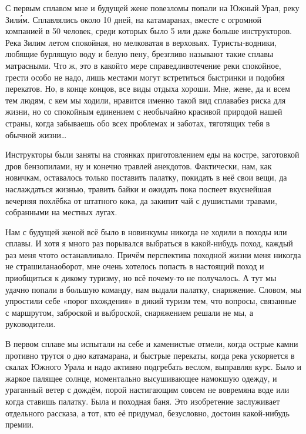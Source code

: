 С первым сплавом мне и будущей жене повезло\mdash мы попали на Южный Урал, реку Зил\'{и}м. Сплавлялись около 10 дней, на катамаранах, вместе с огромной компанией в 50 человек, среди которых было 5 или даже больше инструкторов. Река Зилим летом спокойная, но мелковатая в верховьях. Туристы-водники, любящие бурлящую воду и белую пену, брезгливо называют такие сплавы матрасными. Что ж, это в какой\sdash то мере справедливо\mdash течение реки спокойное, грести особо не надо, лишь местами могут встретиться быстринки и подобия перекатов. Но, в конце концов, все виды отдыха хороши. Мне, жене, да и всем тем людям, с кем мы ходили, нравится именно такой вид сплава\mdash без риска для жизни, но со спокойным единением с необычайно красивой природой нашей страны, когда забываешь обо всех проблемах и заботах, тяготящих тебя в обычной жизни\ldots

Инструкторы были заняты на стоянках приготовлением еды на костре, заготовкой дров бензопилами, ну и конечно травлей анекдотов. Фактически, нам, как новичкам, оставалось только поставить палатку, покидать в неё свои вещи, да наслаждаться жизнью, травить байки и ожидать пока поспеет вкуснейшая вечерняя похлёбка от штатного кока, да закипит чай с душистыми травами, собранными на местных лугах. 

Нам с будущей женой всё было в новинку\mdash мы никогда не ходили в походы или сплавы. И хотя я много раз порывался выбраться в какой-нибудь поход, каждый раз меня что\sdash то останавливало. Причём перспектива походной жизни меня никогда не страшила\mdash наоборот, мне очень хотелось попасть в настоящий поход и приобщиться к дикому туризму, но всё почему-то не получалось. А тут мы удачно попали в большую команду, нам выдали палатку, снаряжение. Словом, мы упростили себе «порог вхождения» в дикий туризм тем, что вопросы, связанные с маршрутом, заброской и выброской, снаряжением решали не мы, а руководители.

В первом сплаве мы испытали на себе и каменистые отмели, когда острые камни противно трутся о дно катамарана, и быстрые перекаты, когда река ускоряется в скалах Южного Урала и надо активно подгребать веслом, выправляя курс. Было и жаркое палящее солнце, моментально высушивающее намокшую одежду, и ураганный ветер с дождём, порой настигающим совсем не вовремя\mdash на воде или когда ставишь палатку. Была и походная баня. Это изобретение заслуживает отдельного рассказа, а тот, кто её придумал, безусловно, достоин какой-нибудь премии.

